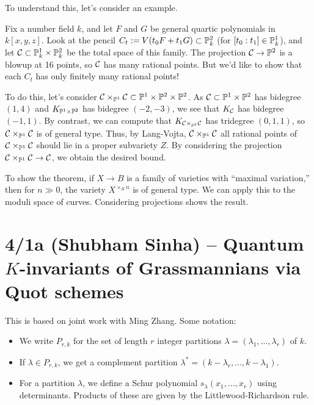 \documentclass{article}
\begin{document}
To understand this, let's consider an example.

\begin{ex}
	Fix a number field $k$, and let $F$ and $G$ be general quartic polynomials in $k[x, y, z]$.
	Look at the pencil $C_t := V(t_0 F + t_1 G) \subset \mathbb{P}^2_k$ (for $[t_0 : t_1] \in \mathbb{P}^1_k$), and let $\mathcal{C} \subset \mathbb{P}^1_k \times \mathbb{P}^2_k$ be the total space of this family.
	The projection $\mathcal{C} \to \mathbb{P}^2$ is a blowup at 16 points, so $\mathcal{C}$ has many rational points.
	But we'd like to show that each $C_t$ has only finitely many rational points!

	To do this, let's consider $\mathcal{C} \times_{\mathbb{P}^1} \mathcal{C} \subset \mathbb{P}^1 \times \mathbb{P}^2 \times \mathbb{P}^2$.
	As $\mathcal{C} \subset \mathbb{P}^1 \times \mathbb{P}^2$ has bidegree $(1, 4)$ and $K_{\mathbb{P}^1 \times \mathbb{P}^2}$ has bidegree $(-2, -3)$, we see that $K_{\mathcal{C}}$ has bidegree $(-1, 1)$.
	By contrast, we can compute that $K_{\mathcal{C} \times_{\mathbb{P}^1} \mathcal{C}}$ has tridegree $(0, 1, 1)$, so $\mathcal{C} \times_{\mathbb{P}^1} \mathcal{C}$ is of general type.
	Thus, by Lang-Vojta, $\mathcal{C} \times_{\mathbb{P}^1} \mathcal{C}$ all rational points of $\mathcal{C} \times_{\mathbb{P}^1} \mathcal{C}$ should lie in a proper subvariety $Z$.
	By considering the projection $\mathcal{C} \times_{\mathbb{P}^1} \mathcal{C} \to \mathcal{C}$, we obtain the desired bound.
\end{ex}

To show the theorem, if $X \to B$ is a family of varieties with ``maximal variation,'' then for $n \gg 0$, the variety $X^{\times_B n}$ is of general type.
We can apply this to the moduli space of curves.
Considering projections shows the result.

\section{4/1a (Shubham Sinha) -- Quantum $K$-invariants of Grassmannians via Quot schemes}

This is based on joint work with Ming Zhang.
Some notation:
\begin{itemize}
	\item We write $P_{r,k}$ for the set of length $r$ integer partitions $\lambda = (\lambda_1, \dots, \lambda_r)$ of $k$.
	\item If $\lambda \in P_{r,k}$, we get a complement partition $\lambda^* = (k - \lambda_r, \dots, k - \lambda_1)$.
	\item For a partition $\lambda$, we define a Schur polynomial $s_\lambda(x_1, \dots, x_r)$ using determinants.
		Products of these are given by the Littlewood-Richardson rule.
\end{itemize}
\end{document}

